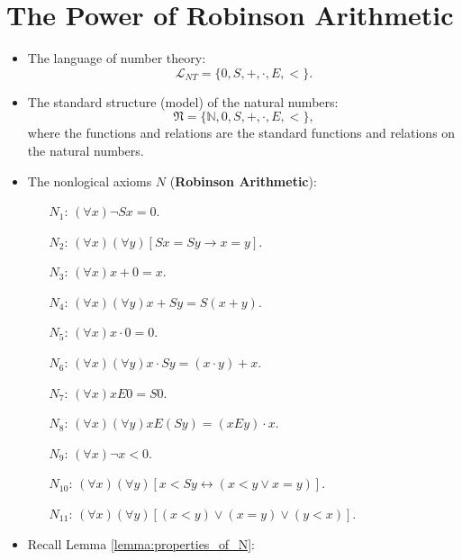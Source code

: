 \documentclass[11pt,letterpaper]{book}
\theoremstyle{definition}
\begin{document}
\section{The Power of Robinson Arithmetic}

\begin{itemize}
\item[]
\item{The language of number theory: $$ \mathcal{L}_{NT} = \{
0,S,+,\cdot, E, < \}.$$}
\item{The standard structure (model) of the natural numbers: $$
\mathfrak{N} =\{ \mathbb{N},0, S, +, \cdot, E, <  \} ,$$
where the functions and relations are the standard functions and
relations on the natural numbers.
}
\item{The nonlogical axioms $N$ (\textbf{Robinson Arithmetic}):}
\begin{enumerate}
\item[$N_1$: ]{$ (\forall x) \lnot S x = 0$.}
\item[$N_2$: ]{$ (\forall x)(\forall y) [Sx = Sy \rightarrow x = y] $.}
\item[$N_3$: ]{$ (\forall x) x + 0 = x $.}
\item[$N_4$: ]{$ (\forall x)(\forall y)x + Sy = S(x+y) $.}
\item[$N_5$: ]{$ (\forall x) x \cdot 0 = 0 $.}
\item[$N_6$: ]{$ (\forall x)(\forall y) x \cdot Sy = (x \cdot y) + x $.}
\item[$N_7$: ]{$ (\forall x) x E 0 = S 0 $.}
\item[$N_8$: ]{$ (\forall x)(\forall y) x E (S y) = (x E y) \cdot x $.}
\item[$N_9$: ]{$ (\forall x) \lnot x < 0 $.}
\item[$N_{10}$: ]{$ (\forall x)(\forall y) [x < Sy \leftrightarrow (x < y \lor x = y
)] $.}
\item[$N_{11}$: ]{$ (\forall x)(\forall y) [(x<y) \lor (x = y) \lor (y < x) ] $.}

\end{enumerate}

\item{Recall Lemma \ref{lemma:properties_of_N}:

\propn*

}
\end{itemize}
\end{document}
